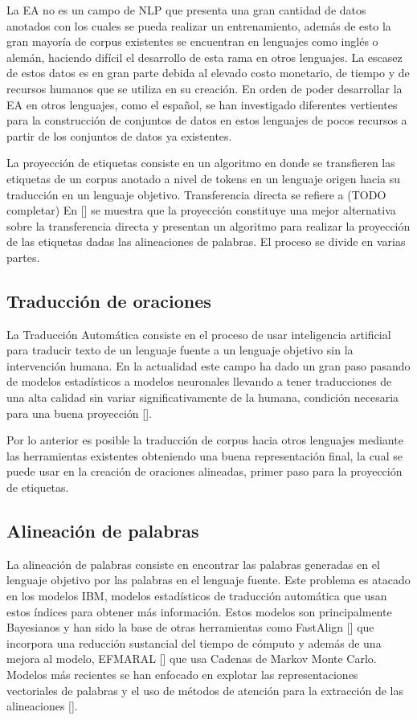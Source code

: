 La EA no es un campo de NLP que presenta una gran cantidad de datos anotados con los cuales se pueda realizar 
un entrenamiento, además de esto la gran mayoría de corpus existentes se encuentran en lenguajes como inglés o alemán,
haciendo difícil el desarrollo de esta rama en otros lenguajes.
La escasez de estos datos es en gran parte debida al elevado costo monetario, de tiempo y de recursos humanos que se utiliza
en su creación. En orden de poder desarrollar la EA en otros lenguajes, como el español, se han investigado diferentes vertientes
para la construcción de conjuntos de datos en estos lenguajes de pocos recursos a partir de los conjuntos de datos ya 
existentes.

La proyección de etiquetas consiste en un algoritmo en donde se 
transfieren las etiquetas de un corpus anotado a nivel de tokens en un lenguaje origen hacia su traducción en un 
lenguaje objetivo. Transferencia directa se refiere a (TODO completar)
En [\cite{eger2018cross}] se muestra que la proyección constituye una mejor alternativa sobre la transferencia
directa y presentan un algoritmo para realizar la proyección de las etiquetas dadas las alineaciones de palabras.
El proceso se divide en varias partes.

\subsection{Traducción de oraciones}

La Traducción Automática consiste en el proceso de usar inteligencia artificial para
traducir texto de un lenguaje fuente a un lenguaje objetivo sin la intervención humana.
En la actualidad este campo ha dado un gran paso pasando de modelos estadísticos a modelos
neuronales llevando a tener traducciones de una alta calidad sin variar significativamente de la humana, 
condición necesaria para una buena proyección [\cite{eger2018cross}].

Por lo anterior es posible la traducción de corpus hacia otros lenguajes mediante las
herramientas existentes obteniendo una buena representación final, la cual se puede usar en la creación de
oraciones alineadas, primer paso para la proyección de etiquetas.

\subsection{Alineación de palabras}

La alineación de palabras consiste en encontrar las palabras generadas en el lenguaje objetivo por las 
palabras en el lenguaje fuente.
Este problema es atacado en los modelos IBM, modelos estadísticos de traducción automática que usan estos 
índices para obtener más información. Estos modelos son principalmente Bayesianos y han sido la base de
otras herramientas como FastAlign [\cite{dyer2013fastalign}] que incorpora una reducción sustancial del
tiempo de cómputo y además de una mejora al modelo, EFMARAL [\cite{ostling2016efficient}] que usa
Cadenas de Markov Monte Carlo. Modelos más recientes se han enfocado en explotar las representaciones
vectoriales de palabras y el uso de métodos de atención para la extracción de las
alineaciones [\cite{dou2021word}].


